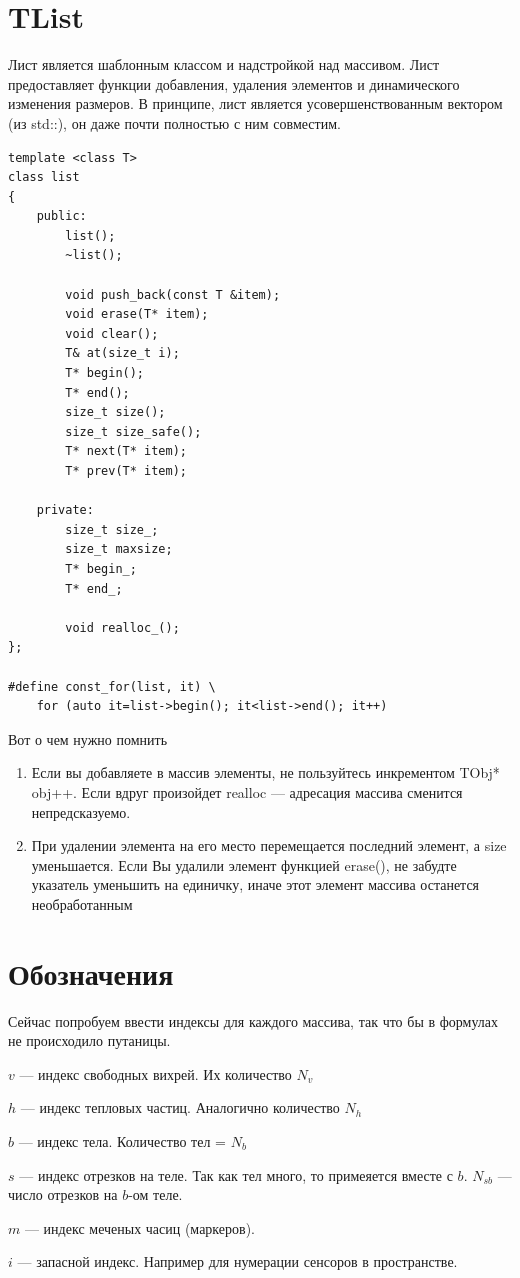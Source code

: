 \documentclass[a4paper,14pt]{extreport}
\newenvironment{packed_itemize}{
\begin{itemize}
  \setlength{\itemsep}{1pt}
  \setlength{\parskip}{0pt}
  \setlength{\parsep}{0pt}
}{\end{itemize}}
\begin{document}
\section{TList}
Лист является шаблонным классом и надстройкой над массивом. 
Лист предоставляет функции добавления, удаления элементов и 
динамического изменения размеров. В принципе, лист является 
усовершенствованным вектором (из std::), он даже почти полностью
с ним совместим.

\begin{lstlisting}
template <class T>
class list
{
	public:
		list();
		~list();

		void push_back(const T &item);
		void erase(T* item);
		void clear();
		T& at(size_t i);
		T* begin();
		T* end();
		size_t size();
		size_t size_safe();
		T* next(T* item);
		T* prev(T* item);

	private:
		size_t size_;
		size_t maxsize;
		T* begin_;
		T* end_;

		void realloc_();
};

#define const_for(list, it) \
	for (auto it=list->begin(); it<list->end(); it++)
\end{lstlisting}

Вот о чем нужно помнить
\begin{enumerate}
\item Если вы добавляете в массив элементы, не пользуйтесь 
инкрементом TObj* obj++. Если вдруг произойдет realloc ---
адресация массива сменится непредсказуемо.
\item При удалении элемента на его место перемещается последний 
элемент, а size уменьшается.
Если Вы удалили элемент функцией erase(), не забудте указатель
уменьшить на единичку, иначе этот элемент массива останется необработанным
\end{enumerate}

\section{Обозначения}
\label{notations}
Сейчас попробуем ввести индексы для каждого массива, так что бы в формулах не происходило путаницы.
\begin{packed_itemize}
\item $v$ --- индекс свободных вихрей. Их количество $N_v$
\item $h$ --- индекс тепловых частиц. Аналогично количество $N_h$
\item $b$ --- индекс тела. Количество тел = $N_b$
\item $s$ --- индекс отрезков на теле. Так как тел много, то примеяется вместе с $b$. $N_{sb}$ --- число отрезков на $b$-ом теле.
\item $m$ --- индекс меченых часиц (маркеров).
\item $i$ --- запасной индекс. Например для нумерации сенсоров в пространстве.
\end{packed_itemize}
\end{document}
